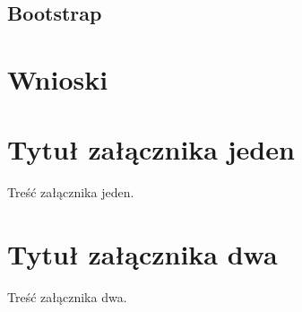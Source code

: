 \documentclass[brudnopis]{xmgr}
\begin{document}
\section{Bootstrap}

\chapter{Wnioski}

\summary

\appendix
\chapter{Tytuł załącznika jeden}

Treść załącznika jeden.
\chapter{Tytuł załącznika dwa}

Treść załącznika dwa.




\nocite {StiveKurg}
\nocite {design}
\nocite {projektowanieUI}
\nocite {magiaUI}
\nocite {UIRails}
\nocite {rails4angular}
\nocite {modelingUI}
\nocite {angularDoc}
\nocite {mongoDoc}
\nocite {rspecDoc}
\nocite {railsDoc}

\listoftables

\listoffigures

\oswiadczenie
\end{document}
